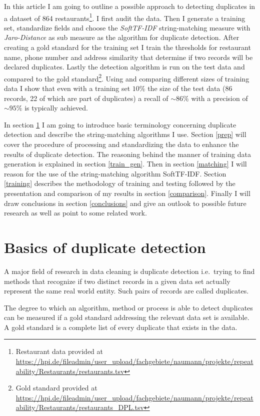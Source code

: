 \documentclass[conference]{IEEEtran}
\newcommand{\unsim}{\mathord{\sim}}
\begin{document}
In this article I am going to outline a possible approach to detecting duplicates in a dataset of 864 
restaurants\footnote{Restaurant data provided at \url{https://hpi.de/fileadmin/user_upload/fachgebiete/naumann/projekte/repeatability/Restaurants/restaurants.tsv}}.
I first audit the data. Then  I generate a training set, standardize fields and choose the \emph{SoftTF-IDF} string-matching measure with \emph{Jaro-Distance} as sub measure as the algorithm for duplicate detection. After creating a gold standard for the training set I train the thresholds for restaurant name, phone number and address similarity that determine if two records will be declared duplicates. Lastly the detection algorithm is run on the test data and compared to the gold 
standard\footnote{Gold standard provided at \url{https://hpi.de/fileadmin/user_upload/fachgebiete/naumann/projekte/repeatability/Restaurants/restaurants_DPL.tsv}}.
Using and comparing different sizes of training data I show that even with a training set $10\%$ the size of the test data (86 records, 22 of which are part of duplicates) a recall of $\unsim86\%$ with a precision of $\unsim95\%$ is typically achieved.

In section \ref{basics} I am going to introduce basic terminology concerning duplicate detection and describe the string-matching algorithms I use. Section \ref{prep} will cover the procedure of processing and standardizing the data to enhance the results of duplicate detection. The reasoning behind the manner of training data generation is explained in section \ref{train_gen}. Then in section \ref{matching} I will reason for the use of the string-matching algorithm SoftTF-IDF. Section \ref{training} describes the methodology of training and testing followed by the presentation and comparison of my results in section \ref{comparison}. Finally I will draw conclusions in section \ref{conclusions} and give an outlook to possible future research as well as point to some related work.
\section{Basics of duplicate detection}\label{basics}
A major field of research in data cleaning is duplicate detection i.e.\ trying to find methods that recognize if two distinct records in a given data set actually represent the same real world entity. Such pairs of records are called duplicates.

The degree to which an algorithm, method or process is able to detect duplicates can be measured if a gold standard addressing the relevant data set is available. A gold standard is a complete list of every duplicate that exists in the data.
\end{document}
